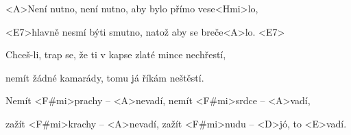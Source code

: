 

\zr
<A>Není nutno, není nutno, aby bylo přímo vese<Hmi>lo,

<E7>hlavně nesmí býti smutno, natož aby se breče<A>lo. <E7>
\kr

\zs
Chceš-li, trap se, že ti v kapse zlaté mince nechřestí,

nemít žádné kamarády, tomu já říkám neštěstí.
\ks

\zs
Nemít <F#mi>prachy -- <A>nevadí, nemít <F#mi>srdce -- <A>vadí,

zažít <F#mi>krachy -- <A>nevadí, zažít <F#mi>nudu -- <D>jó, to <E>vadí.
\ks


\zr \kr

\zr \kr

\kp






